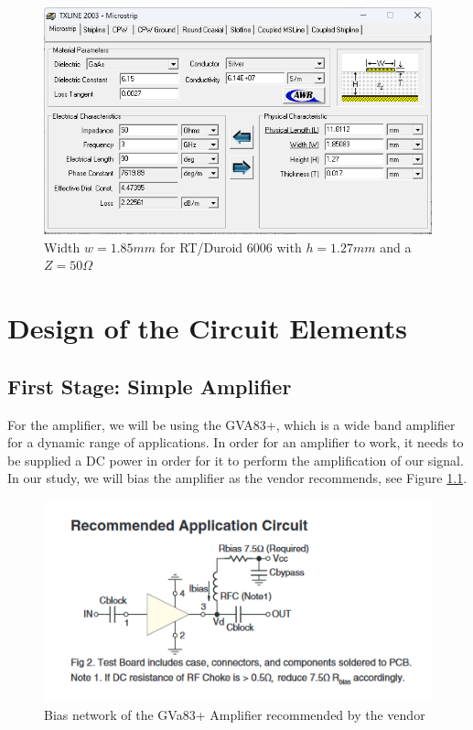 \documentclass[12pt]{report} %
\begin{document}
\begin{figure}[htbp]
    \centering
    \includegraphics[width=\textwidth]{images/previous_work/txline_tool_duroid_6006_h_1_27_mm_50_ohm.png}
    \caption{Width $w = 1.85 mm$ for RT/Duroid 6006 with $h = 1.27 mm$ and a $Z = 50 \Omega$}
    \label{fig:previous_work:duroid_6006_h_1_27_mm_50_ohm}
\end{figure}

\chapter{Design of the Circuit Elements}
\section{First Stage: Simple Amplifier}

For the amplifier, we will be using the GVA83+, which is a wide band amplifier for a dynamic range of applications. In order for an amplifier to work, it needs to be supplied a DC power in order for it to perform the amplification of our signal. In our study, we will bias the amplifier as the vendor recommends, see Figure \ref{fig:design_circuit_elements:gva83+_bias_configuration}. 

\begin{figure}[htbp]
    \centering
    \includegraphics[width=\textwidth]{images/design_circuit_elements/gva83+_bias_configuration.png}
    \caption{Bias network of the GVa83+ Amplifier recommended by the vendor}
    \label{fig:design_circuit_elements:gva83+_bias_configuration}
\end{figure}
\end{document}
